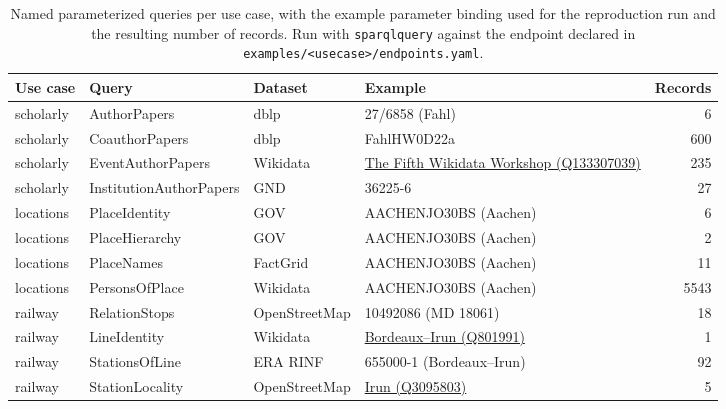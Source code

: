 \documentclass[
]{ceurart}
\newcommand{\wdqTable}[2]{\href{https://www.wikidata.org/wiki/#2}{#1 (#2)}}
\begin{document}
\begin{table}
\caption{Named parameterized queries per use case, with the example parameter
binding used for the reproduction run and the resulting number of records.
Run with \texttt{sparqlquery} against the endpoint declared in
\texttt{examples/<usecase>/endpoints.yaml}.}
\label{tab:usecasequeries}
\begin{tabular}{llllr}
\hline
Use case  & Query        & Dataset & Example              & Records \\
\hline
scholarly & AuthorPapers & dblp    & 27/6858 (Fahl)       & 6   \\
scholarly & CoauthorPapers & dblp  & FahlHW0D22a       & 600 \\
scholarly & EventAuthorPapers & Wikidata & \wdqTable{The Fifth Wikidata Workshop}{Q133307039}   & 235 \\
scholarly & InstitutionAuthorPapers & GND & 36225-6     & 27  \\
locations & PlaceIdentity & GOV & AACHENJO30BS (Aachen) & 6  \\
locations & PlaceHierarchy & GOV & AACHENJO30BS (Aachen) & 2  \\
locations & PlaceNames & FactGrid & AACHENJO30BS (Aachen) & 11  \\
locations & PersonsOfPlace & Wikidata & AACHENJO30BS (Aachen) & 5543  \\
railway   & RelationStops & OpenStreetMap & 10492086 (MD 18061) & 18  \\
railway   & LineIdentity & Wikidata & \wdqTable{Bordeaux--Irun}{Q801991} & 1  \\
railway   & StationsOfLine & ERA RINF & 655000-1 (Bordeaux--Irun) & 92  \\
railway   & StationLocality & OpenStreetMap & \wdqTable{Irun}{Q3095803} & 5  \\
\hline
\end{tabular}
\end{table}
\end{document}
